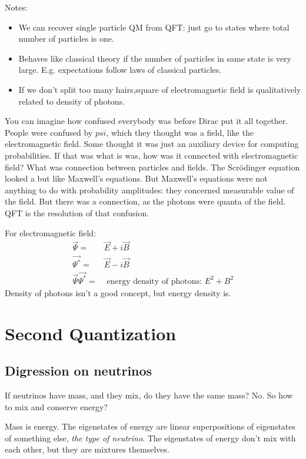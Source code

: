 \documentclass[]{article}
\begin{document}
Notes:
\begin{itemize}
	\item We can recover single particle QM from QFT: just go to states where total number of particles is one.
	\item Behaves like classical theory if the number of particles in same state is very large. E.g. expectations follow  laws of classical particles.
	\item If we don't split too many hairs,square of electromagnetic field is qualitatively related to density of photons.
\end{itemize}

You can imagine how confused everybody was before Dirac put it all together. People were confused by $psi$, which they thought was a field, like the electromagnetic field. Some thought it was just an auxiliary device for computing probabilities. If that was what is was, how was it connected with electromagnetic field? What was connection between particles and fields. The Scr\"odinger equation looked a but like Maxwell's equations. But Maxwell's equations were not anything to do with probability amplitudes: they concerned measurable value of the field. But there was a connection, as the photons were quanta of the field. QFT is the resolution of that confusion.  

For electromagnetic field:
\begin{align*}
	\vec{\Psi} =& \vec{E} + i \vec{B}\\
	\vec{\Psi^*} =& \vec{E} - i \vec{B}\\
	\vec{\Psi} \vec{\Psi^*} =&\text{ energy density of photons: $E^2+B^2$}
\end{align*}
Density of photons isn't a good concept, but energy density is.

\section {Second Quantization}

\subsection{Digression on neutrinos}

If neutrinos have mass, and they mix, do they have the same mass? No. So how to mix and conserve energy?

Mass is energy. The eigenstates of energy are linear superpositions of eigenstates of something else, \emph{the type of neutrino}. The eigenstates of energy don't mix with each other, but they are mixtures themselves.
\end{document}
